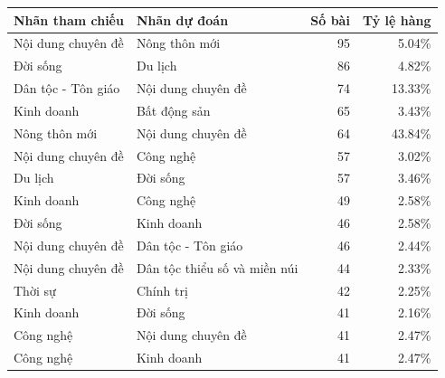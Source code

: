 \begin{tabularx}{\linewidth}{>{\raggedright\arraybackslash}X>{\raggedright\arraybackslash}Xrr}
\toprule
Nhãn tham chiếu & Nhãn dự đoán & Số bài & Tỷ lệ hàng\\\midrule
Nội dung chuyên đề & Nông thôn mới & 95 & 5.04\%\\
Đời sống & Du lịch & 86 & 4.82\%\\
Dân tộc - Tôn giáo & Nội dung chuyên đề & 74 & 13.33\%\\
Kinh doanh & Bất động sản & 65 & 3.43\%\\
Nông thôn mới & Nội dung chuyên đề & 64 & 43.84\%\\
Nội dung chuyên đề & Công nghệ & 57 & 3.02\%\\
Du lịch & Đời sống & 57 & 3.46\%\\
Kinh doanh & Công nghệ & 49 & 2.58\%\\
Đời sống & Kinh doanh & 46 & 2.58\%\\
Nội dung chuyên đề & Dân tộc - Tôn giáo & 46 & 2.44\%\\
Nội dung chuyên đề & Dân tộc thiểu số và miền núi & 44 & 2.33\%\\
Thời sự & Chính trị & 42 & 2.25\%\\
Kinh doanh & Đời sống & 41 & 2.16\%\\
Công nghệ & Nội dung chuyên đề & 41 & 2.47\%\\
Công nghệ & Kinh doanh & 41 & 2.47\%\\
\bottomrule\end{tabularx}
